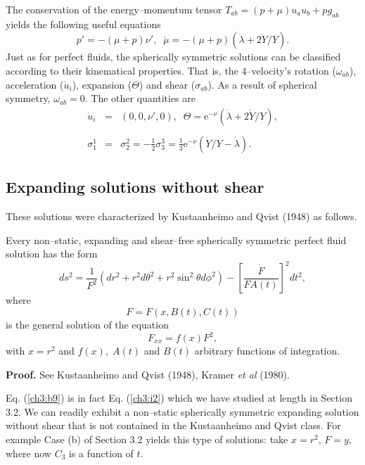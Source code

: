 {The conservation of
the energy--momentum tensor $T_{ab}=(p+\mu)u_au_b+pg_{ab}$
yields the following useful equations
\begin{equation}
p'=-(\mu+p)\nu ',\;\;\dot \mu=-(\mu+p)(\dot \lambda+2\dot Y/Y). \label{ch3:m}
\end{equation} Just as for perfect fluids, the spherically symmetric solutions
can be classified according to their kinematical properties. That is, the
4--velocity's rotation ($\omega_{ab}$), acceleration ($\dot u_i$),
expansion ($\Theta$) and shear ($\sigma_{ab}$).  As a result of spherical symmetry,
$\omega_{ab}=0$. The other quantities  are 
\begin{eqnarray} \dot u_i &= & (0,0,\nu ',0),\;\;  \Theta
=\mbox{e}^{-\nu}(\dot \lambda+2\dot Y/Y), \nonumber\\ &  & \label{ch3:b7} \\
\sigma_1^1 &=&\sigma^2_2=-\frac{1}{2}\sigma_3^3=\frac{1}{3}\mbox{e}^{-\nu}
(\dot Y/Y-\dot \lambda). \nonumber \end{eqnarray} 

\subsection{Expanding solutions without shear} 

These solutions were characterized by
Kustaanheimo and Qvist (1948) as follows. 
\begin{theo}
 \label{ch3:t4}
\begin{em}
Every non--static, expanding and shear--free spherically
symmetric perfect fluid  solution has the form \begin{equation} ds^2
=\frac{1}{F^2}(dr^2+r^2d\theta^2+r^2\sin^2 \theta d\phi^2)-\left [
\frac{\dot F}{FA(t)}\right ]^2dt^2, \label{ch3:b8} \end{equation} where \[
F=F(x,B(t),C(t))\] is the general solution of the equation
\begin{equation} F_{xx}=f(x)F^2, \label{ch3:b9} \end{equation} 
with $x=r^2$ and 
$f(x),\;A(t)$ and $B(t)$ arbitrary functions of integration. \end{em}
\end{theo} 
{\bf Proof.} See Kustaanheimo and Qvist (1948), Kramer {\em et al } (1980).

Eq. (\ref{ch3:b9}) is in fact
Eq. (\ref{ch3:i2}) which we have studied at length in Section 3.2. We can readily
exhibit a non--static spherically symmetric  expanding solution without
shear that is not contained in the Kustaanheimo and Qvist class. For example
Case (b) of Section 3.2 yields this type of solutions:
take $x=r^2$, $F=y$, where now $C_3$ is a function of $t$.

}
